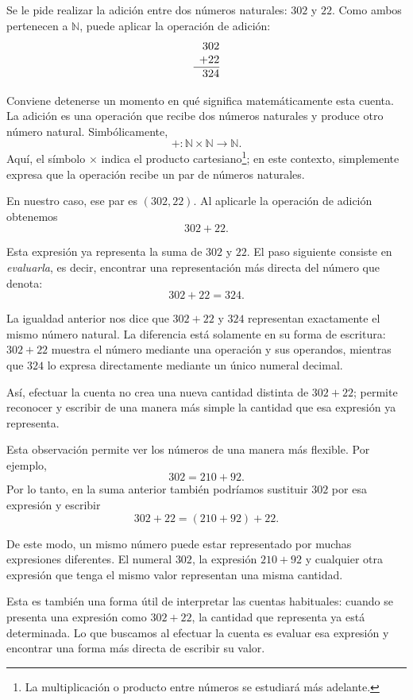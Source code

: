 \begin{example}
Se le pide realizar la adición entre dos números naturales: \(302\) y \(22\). Como ambos pertenecen a \(\mathbb{N}\), puede aplicar la operación de adición:
\[
\begin{array}{r@{}}
    302 \\
    +22 \\
    \hline
    324 \\
  \end{array}
\]

Conviene detenerse un momento en qué significa matemáticamente esta cuenta. La adición es una operación que recibe dos números naturales y produce otro número natural. Simbólicamente,
\[
+\colon \mathbb{N}\times\mathbb{N}\to\mathbb{N}.
\]
Aquí, el símbolo \(\times\) indica el producto cartesiano\footnote{La multiplicación o producto entre números se estudiará más adelante.}; en este contexto, simplemente expresa que la operación recibe un par de números naturales.

En nuestro caso, ese par es \((302,22)\). Al aplicarle la operación de adición obtenemos
\[
302+22.
\]

Esta expresión ya representa la suma de \(302\) y \(22\). El paso siguiente consiste en \emph{evaluarla}, es decir, encontrar una representación más directa del número que denota:
\[
302+22=324.
\]

La igualdad anterior nos dice que \(302+22\) y \(324\) representan exactamente el mismo número natural. La diferencia está solamente en su forma de escritura: \(302+22\) muestra el número mediante una operación y sus operandos, mientras que \(324\) lo expresa directamente mediante un único numeral decimal.

Así, efectuar la cuenta no crea una nueva cantidad distinta de \(302+22\); permite reconocer y escribir de una manera más simple la cantidad que esa expresión ya representa.
\end{example}

Esta observación permite ver los números de una manera más flexible. Por ejemplo,
\[
302=210+92.
\]
Por lo tanto, en la suma anterior también podríamos sustituir \(302\) por esa expresión y escribir
\[
302+22=(210+92)+22.
\]

De este modo, un mismo número puede estar representado por muchas expresiones diferentes. El numeral \(302\), la expresión \(210+92\) y cualquier otra expresión que tenga el mismo valor representan una misma cantidad.

Esta es también una forma útil de interpretar las cuentas habituales: cuando se presenta una expresión como \(302+22\), la cantidad que representa ya está determinada. Lo que buscamos al efectuar la cuenta es evaluar esa expresión y encontrar una forma más directa de escribir su valor.

